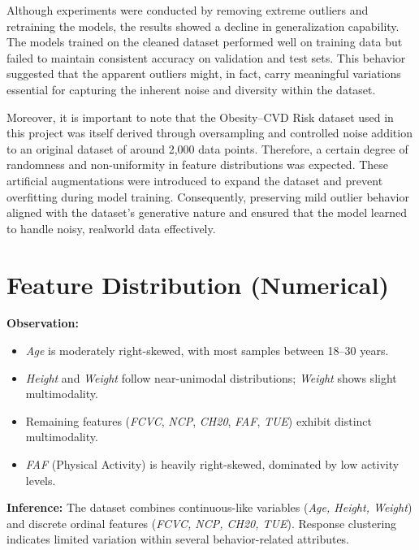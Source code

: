 Although experiments were conducted by removing extreme outliers and retraining the models, the results showed a decline in generalization capability.
The models trained on the cleaned dataset performed well on training data but failed to maintain consistent accuracy on validation and test sets.
This behavior suggested that the apparent outliers might, in fact, carry meaningful variations essential for capturing the inherent noise and diversity within the dataset.

Moreover, it is important to note that the Obesity–CVD Risk dataset used in this project was itself derived through oversampling and controlled noise addition to an original dataset of around 2,000 data points.
Therefore, a certain degree of randomness and non-uniformity in feature distributions was expected.
These artificial augmentations were introduced to expand the dataset and prevent overfitting during model training.
Consequently, preserving mild outlier behavior aligned with the dataset’s generative nature and ensured that the model learned to handle noisy, realworld data effectively.



\section{Feature Distribution (Numerical)}\label{sec:feature-distribution-numerical}

\textbf{Observation:}
\begin{itemize}
    \item \textit{Age} is moderately right-skewed, with most samples between 18–30 years.
    \item \textit{Height} and \textit{Weight} follow near-unimodal distributions; \textit{Weight} shows slight multimodality.
    \item Remaining features (\textit{FCVC}, \textit{NCP}, \textit{CH20}, \textit{FAF}, \textit{TUE}) exhibit distinct multimodality.
    \item \textit{FAF} (Physical Activity) is heavily right-skewed, dominated by low activity levels.
\end{itemize}

\textbf{Inference:}
The dataset combines continuous-like variables (\textit{Age, Height, Weight}) and discrete ordinal features (\textit{FCVC, NCP, CH20, TUE}).
Response clustering indicates limited variation within several behavior-related attributes.

